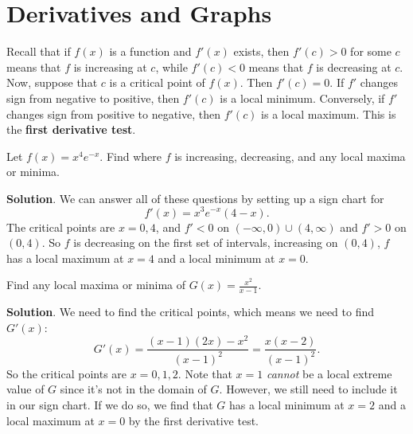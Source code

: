 \documentclass[10pt,]{book}
\newcommand{\terminology}[1]{\textbf{#1}}
\theoremstyle{ptxplainnotitle}
\theoremstyle{ptxplaintitle}
\theoremstyle{ptxplainnotitle}
\theoremstyle{ptxplaintitle}
\theoremstyle{ptxplainnotitle}
\theoremstyle{ptxplaintitle}
\theoremstyle{ptxdefinitionnotitle}
\theoremstyle{ptxdefinitiontitle}
\theoremstyle{ptxdefinitionnotitle}
\theoremstyle{ptxdefinitiontitle}
\theoremstyle{ptxdefinitionnotitle}
\theoremstyle{ptxdefinitiontitle}
\theoremstyle{ptxdefinitionnotitle}
\theoremstyle{ptxdefinitiontitle}
\theoremstyle{ptxdefinitionnotitle}
\theoremstyle{ptxdefinitiontitle}
\numberwithin{equation}{section}
\begin{document}
\section[{Derivatives and Graphs}]{Derivatives and Graphs}\label{section-derivatives-and-graphs}
\hypertarget{p-346}{}%
Recall that if \(f(x)\) is a function and \(f'(x)\) exists, then \(f'(c) > 0\) for some \(c\) means that \(f\) is increasing at \(c\), while \(f'(c) < 0\) means that \(f\) is decreasing at \(c\). Now, suppose that \(c\) is a critical point of \(f(x)\). Then \(f'(c) = 0\). If \(f'\) changes sign from negative to positive, then \(f'(c)\) is a local minimum. Conversely, if \(f'\) changes sign from positive to negative, then \(f'(c)\) is a local maximum. This is the \terminology{first derivative test}.%
\begin{example}\label{example-local-maxima-and-minima-using-the-first-derivative-test}
\hypertarget{p-347}{}%
Let \(f(x) = x^{4}e^{-x}\). Find where \(f\) is increasing, decreasing, and any local maxima or minima.%
\par\smallskip%
\noindent\textbf{Solution}.\hypertarget{solution-75}{}\quad%
\hypertarget{p-348}{}%
We can answer all of these questions by setting up a sign chart for%
\begin{equation*}
f'(x) = x^{3}e^{-x}(4-x)\text{.}
\end{equation*}
The critical points are \(x=0,4\), and \(f' < 0\) on \((-\infty,0)\cup(4,\infty)\) and \(f' > 0\) on \((0,4)\). So \(f\) is decreasing on the first set of intervals, increasing on \((0,4)\), \(f\) has a local maximum at \(x=4\) and a local minimum at \(x=0\).%
\end{example}
\begin{example}\label{example-first-derivative-test-and-a-discontinuous-function}
\hypertarget{p-349}{}%
Find any local maxima or minima of \(G(x) = \frac{x^{2}}{x-1}\).%
\par\smallskip%
\noindent\textbf{Solution}.\hypertarget{solution-76}{}\quad%
\hypertarget{p-350}{}%
We need to find the critical points, which means we need to find \(G'(x)\):%
\begin{equation*}
G'(x) = \frac{(x-1)(2x) - x^{2}}{(x-1)^{2}} = \frac{x(x-2)}{(x-1)^{2}}.
\end{equation*}
So the critical points are \(x=0,1,2\). Note that \(x=1\) \emph{cannot} be a local extreme value of \(G\) since it's not in the domain of \(G\). However, we still need to include it in our sign chart. If we do so, we find that \(G\) has a local minimum at \(x=2\) and a local maximum at \(x=0\) by the first derivative test.%
\end{example}
\end{document}
